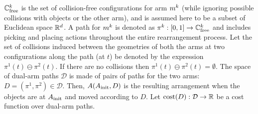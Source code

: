 $\mathbb{C}_{{\rm free}}^k$ is the set of collision-free configurations for arm $m^k$ (while ignoring possible collisions with  objects or the other arm), and is assumed here to be a subset of  Euclidean space $\mathbb{R}^d $.
A path for $m^k$ is denoted as $ \pi^k : [0,1] \rightarrow \mathbb{C}_{{\rm free}}^k$ and includes picking and placing actions throughout the entire rearrangement process. Let the set of collisions induced between the geometries of both the arms at two configurations along the path (at $t$) be denoted by the expression $ \pi^1(t) \ominus \pi^2(t) $. If there are no collisions then $\pi^1(t) \ominus \pi^2(t) = \emptyset$.
The space of dual-arm paths $\mathcal{D}$ is made of pairs of paths for the two arms: $D = (\pi^1,\pi^2) \in \mathcal{D}$. Then, $A(A_{\rm init}, D)$ is the resulting arrangement when the objects are at $A_{\rm init}$ and moved according to $D$.   Let $ \textup{cost}(D) : \mathcal{D} \rightarrow \mathbb{R} $ be a cost function over dual-arm paths. 

